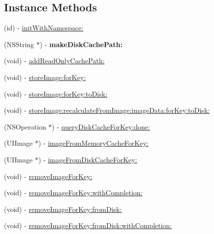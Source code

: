 \subsection*{Instance Methods}
\begin{DoxyCompactItemize}
\item 
(id) -\/ \hyperlink{interface_s_d_image_cache_a586dcc0a4f8b68e5866b8d2c7bdce7db}{init\+With\+Namespace\+:}
\item 
\hypertarget{interface_s_d_image_cache_a48625e7237af6b6b4cc6c52ee8a661b0}{}(N\+S\+String $\ast$) -\/ {\bfseries make\+Disk\+Cache\+Path\+:}\label{interface_s_d_image_cache_a48625e7237af6b6b4cc6c52ee8a661b0}

\item 
(void) -\/ \hyperlink{interface_s_d_image_cache_a9bfedcc9878284b76502287b4b16c1a6}{add\+Read\+Only\+Cache\+Path\+:}
\item 
(void) -\/ \hyperlink{interface_s_d_image_cache_a7b6b4ac73077bb74457d8c6dda577ee0}{store\+Image\+:for\+Key\+:}
\item 
(void) -\/ \hyperlink{interface_s_d_image_cache_a0fca24c5836005dcbd9a12c628e23d0f}{store\+Image\+:for\+Key\+:to\+Disk\+:}
\item 
(void) -\/ \hyperlink{interface_s_d_image_cache_ac5e81b51c7645ac3f095d4bb35719629}{store\+Image\+:recalculate\+From\+Image\+:image\+Data\+:for\+Key\+:to\+Disk\+:}
\item 
(N\+S\+Operation $\ast$) -\/ \hyperlink{interface_s_d_image_cache_aa66fd2fa0008ad893957aeff1a26efda}{query\+Disk\+Cache\+For\+Key\+:done\+:}
\item 
(U\+I\+Image $\ast$) -\/ \hyperlink{interface_s_d_image_cache_abe13b43b333bbb5bbe56142b8d573bd2}{image\+From\+Memory\+Cache\+For\+Key\+:}
\item 
(U\+I\+Image $\ast$) -\/ \hyperlink{interface_s_d_image_cache_ad3502d702952c60cd046ba4e7cba0197}{image\+From\+Disk\+Cache\+For\+Key\+:}
\item 
(void) -\/ \hyperlink{interface_s_d_image_cache_a1d6ca2afef59216e0cb1740d431833cf}{remove\+Image\+For\+Key\+:}
\item 
(void) -\/ \hyperlink{interface_s_d_image_cache_a69e6ab293ca40c795ac6feeb658cb239}{remove\+Image\+For\+Key\+:with\+Completion\+:}
\item 
(void) -\/ \hyperlink{interface_s_d_image_cache_a69b6e3c4082d3e8602e2be641cc851de}{remove\+Image\+For\+Key\+:from\+Disk\+:}
\item 
(void) -\/ \hyperlink{interface_s_d_image_cache_a2a0176203de63d22b85c936eaeb161b0}{remove\+Image\+For\+Key\+:from\+Disk\+:with\+Completion\+:}

\end{DoxyCompactItemize}
